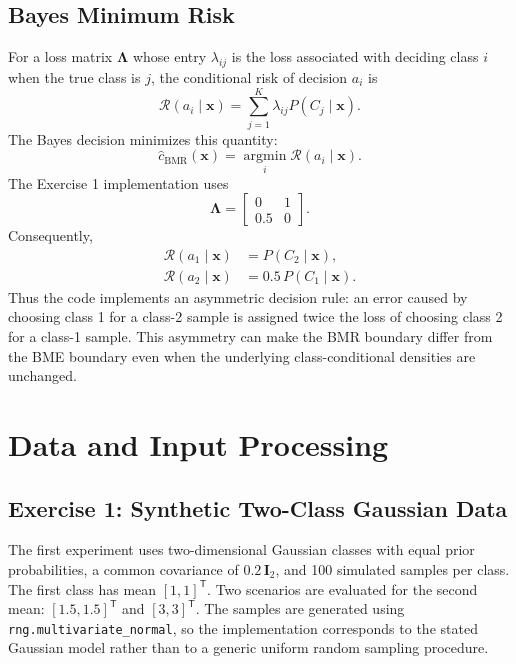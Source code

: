 \documentclass[11pt,a4paper]{article}
\newcommand{\code}[1]{\texttt{#1}}
\newcommand{\R}{\mathcal{R}}
\begin{document}
\subsection{Bayes Minimum Risk}
For a loss matrix $\boldsymbol{\Lambda}$ whose entry $\lambda_{ij}$ is the loss associated with deciding class $i$ when the true class is $j$, the conditional risk of decision $a_i$ is
\begin{equation}
\R(a_i\mid\mathbf{x})
=
\sum_{j=1}^{K}
\lambda_{ij}P(C_j\mid\mathbf{x}).
\end{equation}
The Bayes decision minimizes this quantity:
\begin{equation}
\widehat{c}_{\mathrm{BMR}}(\mathbf{x})
=
\underset{i}{\operatorname{argmin}}
\R(a_i\mid\mathbf{x}).
\end{equation}
The Exercise 1 implementation uses
\begin{equation}
\boldsymbol{\Lambda}
=
\begin{bmatrix}
0 & 1\\
0.5 & 0
\end{bmatrix}.
\end{equation}
Consequently,
\begin{align}
\R(a_1\mid\mathbf{x}) &= P(C_2\mid\mathbf{x}),\\
\R(a_2\mid\mathbf{x}) &= 0.5\,P(C_1\mid\mathbf{x}).
\end{align}
Thus the code implements an asymmetric decision rule: an error caused by choosing class 1 for a class-2 sample is assigned twice the loss of choosing class 2 for a class-1 sample. This asymmetry can make the BMR boundary differ from the BME boundary even when the underlying class-conditional densities are unchanged.

\section{Data and Input Processing}

\subsection{Exercise 1: Synthetic Two-Class Gaussian Data}
The first experiment uses two-dimensional Gaussian classes with equal prior probabilities, a common covariance of $0.2\,\mathbf{I}_2$, and 100 simulated samples per class. The first class has mean $[1,1]^{\mathsf T}$. Two scenarios are evaluated for the second mean: $[1.5,1.5]^{\mathsf T}$ and $[3,3]^{\mathsf T}$. The samples are generated using \code{rng.multivariate\_normal}, so the implementation corresponds to the stated Gaussian model rather than to a generic uniform random sampling procedure.
\end{document}

